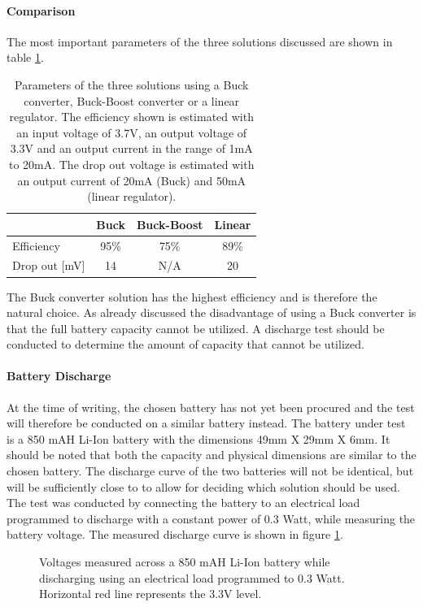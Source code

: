 \paragraph{Comparison}
The most important parameters of the three solutions discussed are shown in table \ref{tab:vol_gen_joint}.

\begin{table}[h]
	\centering
	\begin{tabular}{l|c|c|c}
		  				&	Buck 	& Buck-Boost 	& Linear\\
		 \hline
		 Efficiency  	&  95\% 	& 75\%			&89\%		\\
		 Drop out [mV]		&14  	& N/A		&20		\\
	\end{tabular}
	\caption[Parameters of voltage generation solutions.]{Parameters of the three solutions using a Buck converter, Buck-Boost converter or a linear regulator. The efficiency shown is estimated with an input voltage of 3.7V, an output voltage of 3.3V and an output current in the range of 1mA to 20mA. The drop out voltage is estimated with an output current of 20mA (Buck) and 50mA (linear regulator).}
	\label{tab:vol_gen_joint}
\end{table}

The Buck converter solution has the highest efficiency and is therefore the natural choice.
As already discussed the disadvantage of using a Buck converter is that the full battery capacity cannot be utilized.
A discharge test should be conducted to determine the amount of capacity that cannot be utilized.


\paragraph{Battery Discharge}
At the time of writing, the chosen battery has not yet been procured and the test will therefore be conducted on a similar battery instead.
The battery under test is a 850 mAH Li-Ion battery with the dimensions 49mm X 29mm X 6mm.
It should be noted that both the capacity and physical dimensions are similar to the chosen battery.
The discharge curve of the two batteries will not be identical, but will be sufficiently close to to allow for deciding which solution should be used.
The test was conducted by connecting the battery to an electrical load programmed to discharge with a constant power of 0.3 Watt, while measuring the battery voltage.
The measured discharge curve is shown in figure \ref{fig:bat_discharge}.

\begin{figure}[h]
	\centering
	\caption[Discharge curve of Li-Ion battery.]{Voltages measured across a 850 mAH Li-Ion battery while discharging using an electrical load programmed to 0.3 Watt. Horizontal red line represents the 3.3V level.}
	\label{fig:bat_discharge}
\end{figure}

